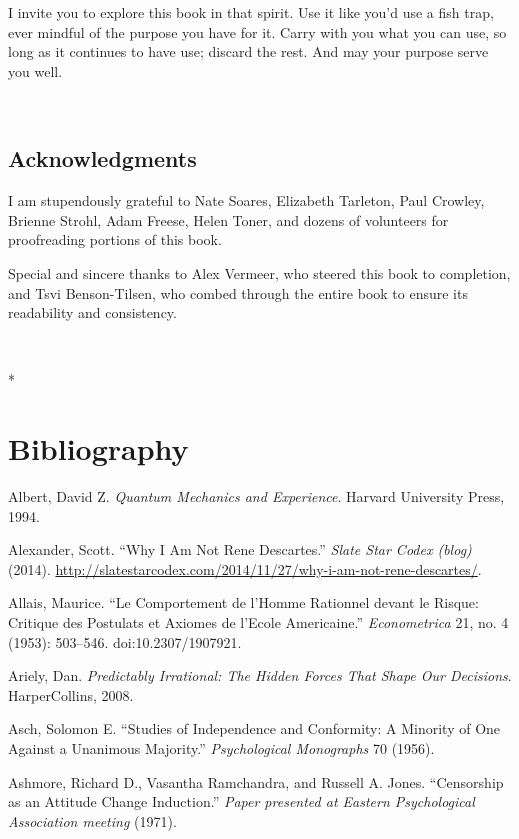 \documentclass[letterpaper]{book}
\newcounter{mysection}
\newcommand{\mysectionnn}[1]{
  \section*{#1}
  \addcontentsline{toc}{section}{#1}
  \setcounter{footnote}{0}
}
\newcommand{\myendsectiontext}{
  {\centering
 \ ~
\par}

{\centering
 *
\par}
}
\begin{document}
{
 I invite you to explore this book in that spirit. Use it like
you'd use a fish trap, ever mindful of the purpose you
have for it. Carry with you what you can use, so long as it continues
to have use; discard the rest. And may your purpose serve you well.}

{
 ~}

\subsection{Acknowledgments}

{
 I am stupendously grateful to Nate Soares, Elizabeth Tarleton,
Paul Crowley, Brienne Strohl, Adam Freese, Helen Toner, and dozens of
volunteers for proofreading portions of this book.}

{
 Special and sincere thanks to Alex Vermeer, who steered this book
to completion, and Tsvi Benson-Tilsen, who combed through the entire
book to ensure its readability and consistency.}

\myendsectiontext


\bigskip








\mysectionnn{Bibliography}

{
 Albert, David Z. \textit{Quantum Mechanics and Experience}.
Harvard University Press, 1994.}

{
 Alexander, Scott. ``Why I Am Not Rene
Descartes.'' \textit{Slate Star Codex (blog)} (2014).
\url{http://slatestarcodex.com/2014/11/27/why-i-am-not-rene-descartes/}.}

{
 Allais, Maurice. ``Le Comportement de
l'Homme Rationnel devant le Risque: Critique des
Postulats et Axiomes de l'Ecole
Americaine.'' \textit{Econometrica} 21, no. 4 (1953):
503--546. doi:10.2307/1907921.}

{
 Ariely, Dan. \textit{Predictably Irrational: The Hidden Forces
That Shape Our Decisions}. HarperCollins, 2008.}

{
 Asch, Solomon E. ``Studies of Independence and
Conformity: A Minority of One Against a Unanimous
Majority.'' \textit{Psychological Monographs} 70
(1956).}

{
 Ashmore, Richard D., Vasantha Ramchandra, and Russell A. Jones.
``Censorship as an Attitude Change
Induction.'' \textit{Paper presented at Eastern
Psychological Association meeting} (1971).}
\end{document}
